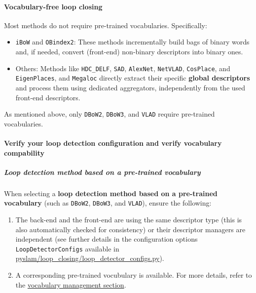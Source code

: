 \documentclass{article}
\let\oldparagraph\paragraph
\renewcommand{\paragraph}[1]{\oldparagraph{#1}\mbox{}}
\let\oldsubparagraph\subparagraph
\renewcommand{\subparagraph}[1]{\oldsubparagraph{#1}\mbox{}}
\begin{document}
\hypertarget{vocabulary-free-loop-closing}{%
\paragraph{Vocabulary-free loop
closing}\label{vocabulary-free-loop-closing}}

Most methods do not require pre-trained vocabularies. Specifically:
\begin{itemize}
\item \texttt{iBoW} and \texttt{OBindex2}: These methods incrementally build
bags of binary words and, if needed, convert (front-end) non-binary
descriptors into binary ones. 
\item Others: Methods like \texttt{HDC\_DELF},
\texttt{SAD}, \texttt{AlexNet}, \texttt{NetVLAD}, \texttt{CosPlace}, and
\texttt{EigenPlaces}, and \texttt{Megaloc} directly extract their specific \textbf{global
descriptors} and process them using dedicated aggregators, independently
from the used front-end descriptors.
\end{itemize}

As mentioned above, only \texttt{DBoW2}, \texttt{DBoW3}, and
\texttt{VLAD} require pre-trained vocabularies.

\hypertarget{double-check-your-loop-detection-configuration-and-verify-vocabulary-compability}{%
\paragraph{Verify your loop detection configuration and verify
vocabulary
compability}\label{double-check-your-loop-detection-configuration-and-verify-vocabulary-compability}}

\hypertarget{loop-detection-method-based-on-a-pre-trained-vocabulary}{%
\subparagraph{Loop detection method based on a pre-trained
vocabulary}\label{loop-detection-method-based-on-a-pre-trained-vocabulary}}

When selecting a \textbf{loop detection method based on a pre-trained
vocabulary} (such as \texttt{DBoW2}, \texttt{DBoW3}, and \texttt{VLAD}),
ensure the following: 
\begin{enumerate}
\item The back-end and the front-end are using the
same descriptor type (this is also automatically checked for
consistency) or their descriptor managers are independent (see further
details in the configuration options \texttt{LoopDetectorConfigs}
available in \href{https://github.com/luigifreda/pyslam/blob/master/pyslam/loop_closing/loop_detector_configs.py}{pyslam/loop\_closing/loop\_detector\_configs.py}). 
\item A corresponding pre-trained vocubulary is available. For more details,
refer to the \protect\hyperlink{vocabulary-management}{vocabulary
management section}.
\end{enumerate}
\end{document}
